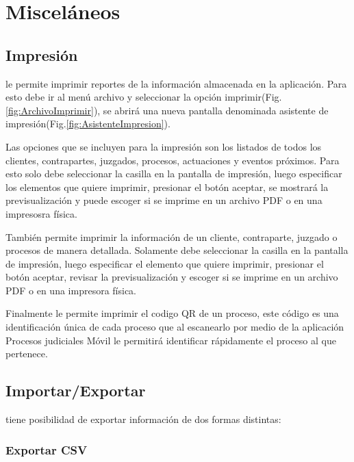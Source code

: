 \chapter{Miscel\'aneos}
\label{sec:miscelaneo}

\section{Impresi\'on}

\softwareAbogadosDesktop le permite imprimir reportes de la informaci\'on almacenada en la aplicaci\'on. Para esto debe ir al men\'u archivo y seleccionar la opci\'on imprimir(Fig.\ref{fig:ArchivoImprimir}), se abrir\'a una nueva pantalla denominada asistente de impresi\'on(Fig.\ref{fig:AsistenteImpresion}). 
  

Las opciones que se incluyen para la impresi\'on son los listados de todos los  clientes, contrapartes, juzgados, procesos, actuaciones y eventos pr\'oximos. Para esto solo debe seleccionar la casilla en la pantalla de impresi\'on, luego especificar los elementos que quiere imprimir, presionar el bot\'on aceptar, se mostrar\'a la previsualizaci\'on y puede escoger si se imprime en un archivo PDF o en una impresosra f\'isica.
 
Tambi\'en permite imprimir la informaci\'on de un cliente, contraparte, juzgado o procesos de manera detallada. Solamente debe seleccionar la casilla en la pantalla de impresi\'on, luego especificar el elemento que quiere imprimir, presionar el bot\'on aceptar, revisar la previsualizaci\'on y escoger si se imprime en un archivo PDF o en una impresora f\'isica.
 
Finalmente le permite imprimir el codigo QR de un proceso, este c\'odigo es una identificaci\'on \'unica de cada proceso que al escanearlo por medio de la aplicaci\'on Procesos judiciales M\'ovil le permitir\'a identificar r\'apidamente el proceso al que pertenece.

\section{Importar/Exportar}

\softwareAbogadosDesktop tiene posibilidad de exportar informaci\'on de dos formas distintas:

\subsection{Exportar CSV}

